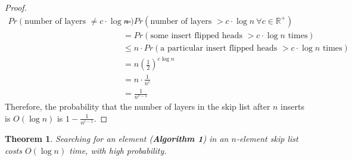 \documentclass[11pt]{article}
\theoremstyle{plain}
\newtheorem{thm}{Theorem}
\theoremstyle{definition}
\newcommand{\R}{\mathbb{R}}
\begin{document}
\begin{proof}
    \begin{align*}
         Pr(\text{number of layers }\neq c \cdot \log n) &= Pr(\text{number of layers }> c \cdot \log n
         \: \forall c \in \R^+)\\
                                                         &= Pr(\text{some insert flipped heads }
                                                         > c \cdot \log n \text{ times})\\
                                                         &\leq n \cdot Pr(\text{a particular insert 
                                                             flipped heads }
                                                         > c \cdot \log n \text{ times})\\
                                                         &= n \left(\frac{1}{2}\right)^{c \log n}\\
                                                         &= n \cdot \frac{1}{n^c}\\
                                                         &= \frac{1}{n^{c-1}}
    \end{align*}
    Therefore, the probability that the number of layers in the skip list after $n$ inserts is
    $O(\log n)$ is $1 - \displaystyle\frac{1}{n^{c-1}}$.
\end{proof}

\begin{thm}
    Searching for an element (\textbf{Algorithm 1}) in an $n$-element skip list costs $O(\log n)$ 
    time, with high probability.
\end{thm}
\end{document}
